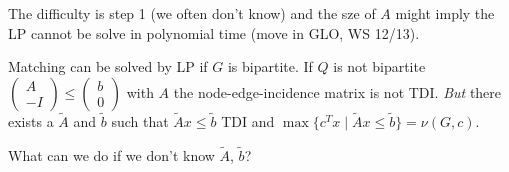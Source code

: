 The difficulty is step 1 (we often don't know) and the sze of $A$ might
imply the LP cannot be solve in polynomial time (move in GLO, WS 12/13).

\begin{xmp+}
Matching can be solved by LP if $G$ is bipartite. If $Q$ is not bipartite
$\begin{pmatrix} A \\ -I \end{pmatrix} \leq \begin{pmatrix} b \\ 0
\end{pmatrix}$ with $A$ the node-edge-incidence matrix is not TDI.
\emph{But} there exists a $\tilde{A}$ and $\tilde{b}$ such that $\tilde{A} x
\leq \tilde{b}$ TDI and $\max \{ c^T x \mid \tilde{A} x \leq \tilde{b} \} =
\nu(G, c)$.
\end{xmp+}

\begin{qstn}
What can we do if we don't know $\tilde{A}$, $\tilde{b}$?
\end{qstn}
